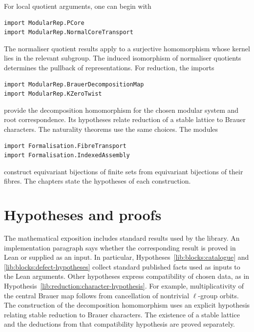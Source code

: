 For local quotient arguments, one can begin with
\begin{samepage}
\begin{verbatim}
import ModularRep.PCore
import ModularRep.NormalCoreTransport
\end{verbatim}
\end{samepage}
The normaliser quotient results apply to a surjective homomorphism whose
kernel lies in the relevant subgroup. The induced isomorphism of
normaliser quotients determines the pullback of representations.
For reduction, the imports
\begin{samepage}
\begin{verbatim}
import ModularRep.BrauerDecompositionMap
import ModularRep.KZeroTwist
\end{verbatim}
\end{samepage}
provide the decomposition homomorphism for the chosen modular system and
root correspondence. Its hypotheses relate reduction of a stable lattice
to Brauer characters. The naturality theorems use the same choices. The modules
\begin{samepage}
\begin{verbatim}
import Formalisation.FibreTransport
import Formalisation.IndexedAssembly
\end{verbatim}
\end{samepage}
construct equivariant bijections of finite sets from equivariant
bijections of their fibres. The chapters state the hypotheses of each
construction.

\section{Hypotheses and proofs}

The mathematical exposition includes standard results used by the library.
An implementation paragraph says whether the corresponding result is
proved in Lean or supplied as an input. In particular,
Hypotheses~\ref{lib:blocks:catalogue} and
\ref{lib:blocks:defect-hypotheses} collect standard published facts
used as inputs to the Lean arguments. Other hypotheses express
compatibility of chosen data, as in
Hypothesis~\ref{lib:reduction:character-hypothesis}.
For example, multiplicativity of
the central Brauer map follows from cancellation of nontrivial
$\ell$-group orbits. The construction of the decomposition homomorphism
uses an explicit hypothesis relating stable reduction to Brauer
characters. The existence of a stable lattice and the deductions from
that compatibility hypothesis are proved separately.

